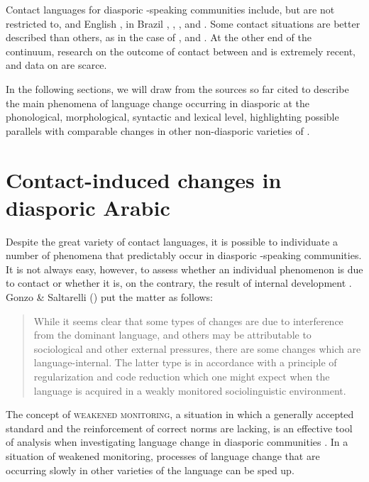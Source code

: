 \documentclass[output=paper]{langsci/langscibook}
\begin{document}
Contact languages for diasporic -speaking communities include, but are not restricted to,  \citep{Rouchdy_arabic_1992} and  {English} \citep{AbuHaidar2012},  in Brazil \citep[292]{Versteegh2014book},   \citep{BoumansCaubet2000},  \citep{Boumans2000,Boumans2004,Boumans2007,BoumansCaubet2000,BoumansdeRuiter2002},  \citep{Vicente2005,Vicente2007} and  \citep{Danna2017book,Danna2018Chebba}. Some contact situations are better described than others, as in the case of ,  and . At the other end of the continuum, research on the outcome of contact between  and  is extremely recent, and data on  are scarce.

In the following sections, we will draw from the sources so far cited to describe the main phenomena of {language change} occurring in diasporic  at the phonological, morphological, syntactic and lexical level, highlighting possible parallels with comparable changes in other non-diasporic varieties of .

\section{Contact-induced changes in diasporic Arabic}

Despite the great variety of contact languages, it is possible to individuate a number of phenomena that predictably occur in diasporic -speaking communities. It is not always easy, however, to assess whether an individual phenomenon is due to contact or whether it is, on the contrary, the result of internal development \citep[377]{Romaine1989}. Gonzo \& Saltarelli (\citeyear[177]{GonzoSaltarelli1977}) put the matter as follows:

\begin{quote}While it seems clear that some types of changes are due to interference from the dominant language, and others may be attributable to sociological and other external pressures, there are some changes which are language-internal. The latter type is in accordance with a principle of regularization and code reduction which one might expect when the language is acquired in a weakly monitored sociolinguistic environment.\end{quote}

The concept of \textsc{weakened} \textsc{monitoring}, a situation in which a generally accepted standard and the reinforcement of correct norms are lacking, is an effective tool of analysis when investigating {language change} in diasporic communities \citep{GonzoSaltarelli1977,GonzoSaltarelli1983}. In a situation of weakened monitoring, processes of {language change} that are occurring slowly in other varieties of the language can be sped up.
\end{document}
